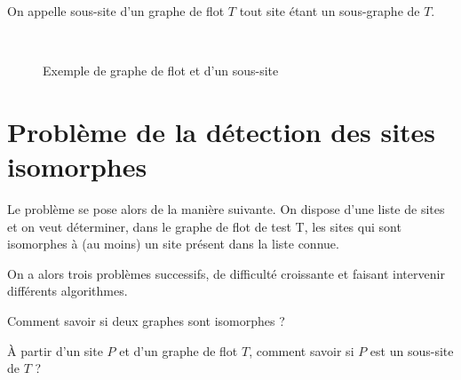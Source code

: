 \begin{defi}\label{def-soussite}
On appelle sous-site d'un graphe de flot $T$ tout site étant un sous-graphe de $T$.
\end{defi}

\begin{figure}[ht]
\begin{center}
  \subfigure[Graphe de flot T]{
\label{fig:ex-gf}
\epsfig{figure=supports/algos/images/c_gTGF.pdf,height=3.5cm}}\quad
  \subfigure[Site P, de racine b, isomorphe à un sous-graphe de T]{
\label{fig:ex-site}
\epsfig{figure=supports/algos/images/c_gPsite.pdf,height=3cm}}\\
\end{center}
\caption{Exemple de graphe de flot et d'un sous-site}
\label{fig:ex-gf-site}
\end{figure}



\section{Problème de la détection des sites isomorphes}
Le problème se pose alors de la manière suivante. On dispose d'une liste de sites et %
on veut déterminer, dans le graphe de flot de test T, les sites qui sont isomorphes à (au moins) un site présent dans la liste connue. 

On a alors trois problèmes successifs, de difficulté croissante et faisant intervenir différents algorithmes.
\begin{pb}\label{pbisog}
 Comment savoir si deux graphes sont isomorphes ?
\end{pb}

\begin{pb}\label{pbisosg}
 À partir d'un site $P$ et d'un graphe de flot $T$, comment savoir si $P$ est un sous-site de $T$ ?
\end{pb}

